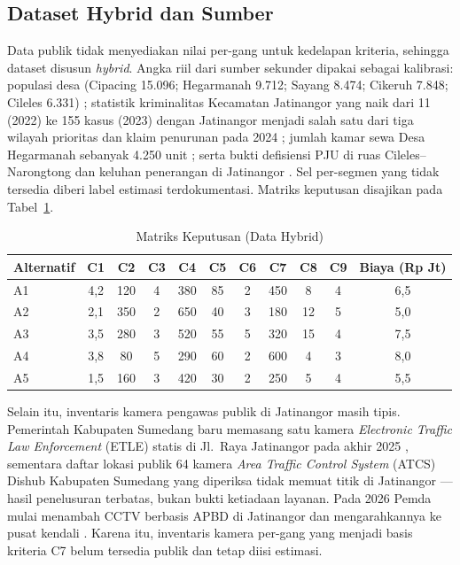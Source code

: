 \documentclass[10pt,twocolumn,a4paper]{article}
\begin{document}
\subsection{Dataset Hybrid dan Sumber}
Data publik tidak menyediakan nilai per-gang untuk kedelapan kriteria, sehingga dataset disusun \textit{hybrid}. Angka riil dari sumber sekunder dipakai sebagai kalibrasi: populasi desa (Cipacing 15.096; Hegarmanah 9.712; Sayang 8.474; Cikeruh 7.848; Cileles 6.331) \cite{eoffice}; statistik kriminalitas Kecamatan Jatinangor yang naik dari 11 (2022) ke 155 kasus (2023) dengan Jatinangor menjadi salah satu dari tiga wilayah prioritas \cite{kabarsumedang} dan klaim penurunan pada 2024 \cite{harapanrakyat}; jumlah kamar sewa Desa Hegarmanah sebanyak 4.250 unit \cite{hegarmanah}; serta bukti defisiensi PJU di ruas Cileles--Narongtong \cite{kapol} dan keluhan penerangan di Jatinangor \cite{sumedangtandang}. Sel per-segmen yang tidak tersedia diberi label estimasi terdokumentasi. Matriks keputusan disajikan pada Tabel~\ref{tab:x}.

\begin{table}[t]
\caption{Matriks Keputusan (Data Hybrid)}
\label{tab:x}
\centering
\footnotesize
\begin{tabular}{@{}l cccccccc c c@{}}
\toprule
Alternatif & C1 & C2 & C3 & C4 & C5 & C6 & C7 & C8 & C9 & Biaya (Rp Jt) \\
\midrule
A1 & 4,2 & 120 & 4 & 380 & 85 & 2 & 450 & 8 & 4 & 6,5 \\
A2 & 2,1 & 350 & 2 & 650 & 40 & 3 & 180 & 12 & 5 & 5,0 \\
A3 & 3,5 & 280 & 3 & 520 & 55 & 5 & 320 & 15 & 4 & 7,5 \\
A4 & 3,8 & 80 & 5 & 290 & 60 & 2 & 600 & 4 & 3 & 8,0 \\
A5 & 1,5 & 160 & 3 & 420 & 30 & 2 & 250 & 5 & 4 & 5,5 \\
\bottomrule
\end{tabular}
\end{table}

Selain itu, inventaris kamera pengawas publik di Jatinangor masih tipis. Pemerintah Kabupaten Sumedang baru memasang satu kamera \textit{Electronic Traffic Law Enforcement} (ETLE) statis di Jl.\ Raya Jatinangor pada akhir 2025 \cite{etle}, sementara daftar lokasi publik 64 kamera \textit{Area Traffic Control System} (ATCS) Dishub Kabupaten Sumedang yang diperiksa tidak memuat titik di Jatinangor \cite{atcs} --- hasil penelusuran terbatas, bukan bukti ketiadaan layanan. Pada 2026 Pemda mulai menambah CCTV berbasis APBD di Jatinangor dan mengarahkannya ke pusat kendali \cite{cctvapbd}. Karena itu, inventaris kamera per-gang yang menjadi basis kriteria C7 belum tersedia publik dan tetap diisi estimasi.
\end{document}
